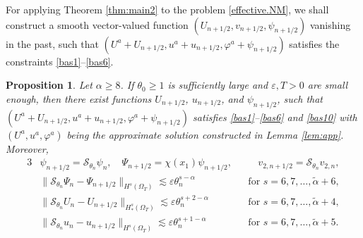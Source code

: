 \documentclass[twoside,11pt]{article}
\numberwithin{equation}{section}
\newtheorem{proposition}[lemma]{Proposition}
\begin{document}
For applying Theorem \ref{thm:main2} to the problem \eqref{effective.NM},
we shall construct a smooth vector-valued function $(U_{n+1/2},v_{n+1/2}, \psi_{n+1/2})$ vanishing in the past, such that $(U^a+U_{n+1/2},u^a+u_{n+1/2},\varphi^a+\psi_{n+1/2})$ satisfies the constraints \eqref{bas1}--\eqref{bas6}.
\begin{proposition}
	\label{pro:modified}
	Let ${\alpha }\geq 8$.
	If $\theta_0\geq 1$ is sufficiently  large and $\varepsilon,T>0$ are small enough, then
	there exist functions $U_{n+1/2}$, $u_{n+1/2}$, and $\psi_{n+1/2}$,
	such that $(U^a+U_{n+1/2},u^a+u_{n+1/2}, \varphi^a+\psi_{n+1/2})$ satisfies \eqref{bas1}--\eqref{bas6}
	and \eqref{bas10}
	with $(U^a, u^a, \varphi^a)$ being the approximate solution constructed in Lemma \textrm{\ref{lem:app}}.
	Moreover,
	\begin{alignat}{3}
		\label{MS.id1}	& \psi_{n+1/2}=\mathcal{S}_{\theta_n}\psi_{{n}},\quad \Psi_{n+1/2}=\chi(x_1)\psi_{n+1/2},&& \quad v_{2, n+1/2}=\mathcal{S}_{\theta_n} v_{2, n},\\[1mm]
		\label{MS.est1}	&\|\mathcal{S}_{\theta_n}\Psi_n-\Psi_{n+1/2}\|_{H^s(\Omega_{T})}\lesssim \varepsilon \theta_n^{s-{\alpha }}
		&& \textrm{for } s=6,7,\ldots,\widetilde{\alpha}+6,  \\
		\label{MS.est2}	&  \|\mathcal{S}_{\theta_n}U_n-U_{n+1/2}\|_{H_*^s(\Omega_{T})}
		\lesssim \varepsilon \theta_n^{s+2-{\alpha }}
		&&\textrm{for } s=6,7,\ldots,\widetilde{\alpha}+4,  \\
		\label{MS.est3}	 & \|\mathcal{S}_{\theta_n}u_n-u_{n+1/2}\|_{H^{s}(\Omega_{T})}
		\lesssim \varepsilon \theta_n^{s+1-{\alpha }}
		&&   \textrm{for } s=6,7,\ldots,\widetilde{\alpha}+5.
	\end{alignat}
\end{proposition}
\end{document}
